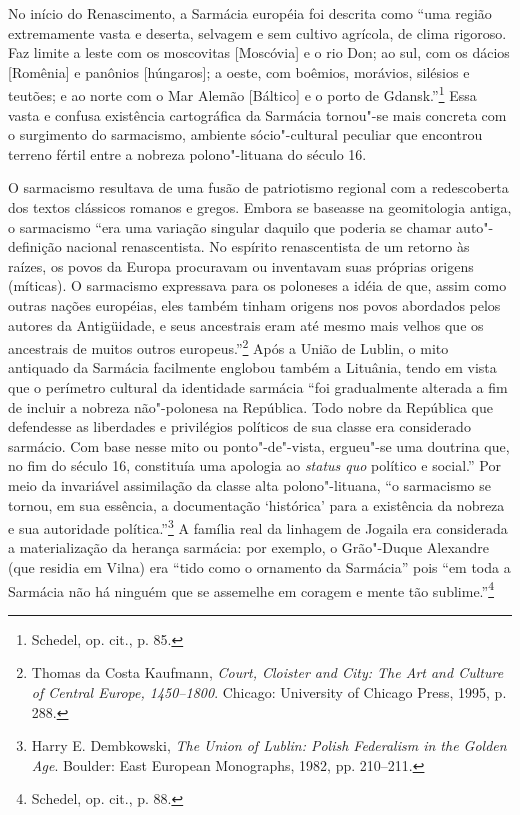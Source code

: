No início do Renascimento, a Sarmácia européia foi descrita como ``uma
região extremamente vasta e deserta, selvagem e sem cultivo agrícola, de
clima rigoroso. Faz limite a leste com os moscovitas {[}Moscóvia{]} e o
rio Don; ao sul, com os dácios {[}Romênia{]} e panônios {[}húngaros{]};
a oeste, com boêmios, morávios, silésios e teutões; e ao norte com o Mar
Alemão {[}Báltico{]} e o porto de Gdansk.''\footnote{Schedel, op. cit.,
  p. 85.} Essa vasta e confusa existência cartográfica da Sarmácia
tornou"-se mais concreta com o surgimento do sarmacismo, ambiente
sócio"-cultural peculiar que encontrou terreno fértil entre a nobreza
polono"-lituana do século 16.

O sarmacismo resultava de uma fusão de patriotismo regional com a
redescoberta dos textos clássicos romanos e gregos. Embora se baseasse
na geomitologia antiga, o sarmacismo ``era uma variação singular daquilo
que poderia se chamar auto"-definição nacional renascentista. No espírito
renascentista de um retorno às raízes, os povos da Europa procuravam ou
inventavam suas próprias origens (míticas). O sarmacismo expressava para
os poloneses a idéia de que, assim como outras nações européias, eles
também tinham origens nos povos abordados pelos autores da Antigüidade,
e seus ancestrais eram até mesmo mais velhos que os ancestrais de muitos
outros europeus.''\footnote{Thomas da Costa Kaufmann, \emph{Court,
  Cloister and City: The Art and Culture of Central Europe, 1450--1800}.
  Chicago: University of Chicago Press, 1995, p. 288.} Após a União de
Lublin, o mito antiquado da Sarmácia facilmente englobou também a
Lituânia, tendo em vista que o perímetro cultural da identidade sarmácia
``foi gradualmente alterada a fim de incluir a nobreza não"-polonesa na
República. Todo nobre da República que defendesse as liberdades e
privilégios políticos de sua classe era considerado sarmácio. Com base
nesse mito ou ponto"-de"-vista, ergueu"-se uma doutrina que, no fim do
século 16, constituía uma apologia ao \emph{status quo} político e
social.'' Por meio da invariável assimilação da classe alta
polono"-lituana, ``o sarmacismo se tornou, em sua essência, a
documentação `histórica' para a existência da nobreza e sua autoridade
política.''\footnote{Harry E. Dembkowski, \emph{The Union of Lublin:
  Polish Federalism in the Golden Age}. Boulder: East European
  Monographs, 1982, pp. 210--211.} A família real da linhagem de Jogaila
era considerada a materialização da herança sarmácia: por exemplo, o
Grão"-Duque Alexandre (que residia em Vilna) era ``tido como o ornamento
da Sarmácia'' pois ``em toda a Sarmácia não há ninguém que se assemelhe
em coragem e mente tão sublime.''\footnote{Schedel, op. cit., p. 88.}

